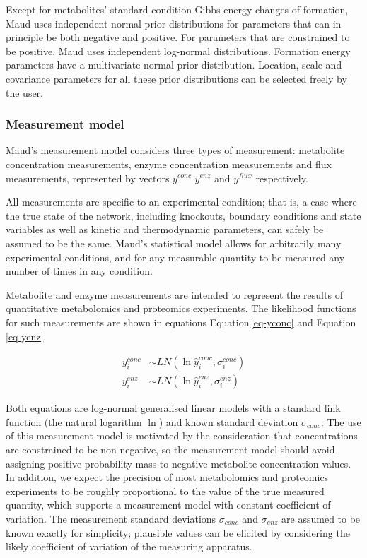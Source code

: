 \documentclass[journal=asbcd6,manuscript=article,layout=traditional]{achemso}
\begin{document}
Except for metabolites' standard condition Gibbs energy changes of
formation, Maud uses independent normal prior distributions for
parameters that can in principle be both negative and positive. For
parameters that are constrained to be positive, Maud uses independent
log-normal distributions. Formation energy parameters have a
multivariate normal prior distribution. Location, scale and covariance
parameters for all these prior distributions can be selected freely by
the user.

\hypertarget{measurement-model}{%
\subsubsection{Measurement model}\label{measurement-model}}

Maud's measurement model considers three types of measurement:
metabolite concentration measurements, enzyme concentration measurements
and flux measurements, represented by vectors \(𝑦^{𝑐𝑜𝑛𝑐}\) \(𝑦^{𝑒𝑛𝑧}\)
and \(𝑦^{𝑓𝑙𝑢𝑥}\) respectively.

All measurements are specific to an experimental condition; that is, a
case where the true state of the network, including knockouts, boundary
conditions and state variables as well as kinetic and thermodynamic
parameters, can safely be assumed to be the same. Maud's statistical
model allows for arbitrarily many experimental conditions, and for any
measurable quantity to be measured any number of times in any condition.

Metabolite and enzyme measurements are intended to represent the results
of quantitative metabolomics and proteomics experiments. The likelihood
functions for such measurements are shown in equations
Equation\,\eqref{eq-yconc} and Equation\,\eqref{eq-yenz}.

\begin{align}
y_i^{conc} &\sim LN(\ln{\hat{y}_i^{conc}}, \sigma_i^{conc})\label{eq-yconc} \\
y_i^{enz} &\sim LN(\ln{\hat{y}_i^{enz}}, \sigma_i^{enz})\label{eq-yenz}
\end{align}

Both equations are log-normal generalised linear models with a standard
link function (the natural logarithm \(\ln\)) and known standard
deviation \(\sigma_{𝑐𝑜𝑛𝑐}\). The use of this measurement model is
motivated by the consideration that concentrations are constrained to be
non-negative, so the measurement model should avoid assigning positive
probability mass to negative metabolite concentration values. In
addition, we expect the precision of most metabolomics and proteomics
experiments to be roughly proportional to the value of the true measured
quantity, which supports a measurement model with constant coefficient
of variation. The measurement standard deviations \(\sigma_{𝑐𝑜𝑛𝑐}\) and
\(\sigma_{𝑒𝑛𝑧}\) are assumed to be known exactly for simplicity;
plausible values can be elicited by considering the likely coefficient
of variation of the measuring apparatus.
\end{document}
